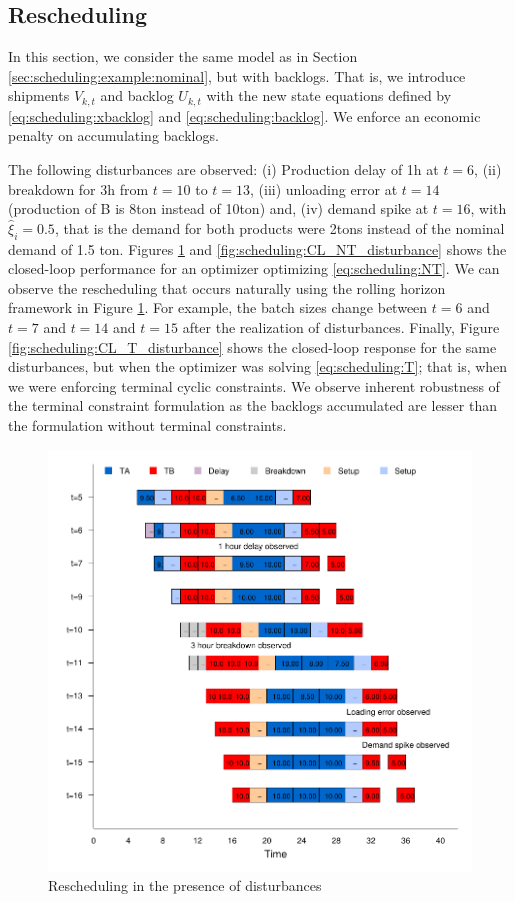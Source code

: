 \subsection{Rescheduling}
In this section, we consider the same model as in Section
\ref{sec:scheduling:example:nominal}, but with backlogs. That is, we
introduce shipments $V_{k,t}$ and backlog $U_{k,t}$ with the new state
equations defined by \eqref{eq:scheduling:xbacklog} and
\eqref{eq:scheduling:backlog}. We enforce an economic penalty on
accumulating backlogs. 

The following disturbances are observed: (i) Production delay of 1h
at $t=6$, (ii) breakdown for 3h  from $t=10$ to $t=13$, (iii)
unloading error at $t=14$ (production of  B is 8ton instead of 10ton)
and, (iv) demand spike at $t=16$, with $\hat{\xi}_i = 0.5$, that is
the demand for both products were 2tons instead of the nominal demand
of 1.5 ton. Figures \ref{fig:scheduling:gantt_NT_disturbance} and
\ref{fig:scheduling:CL_NT_disturbance} shows the closed-loop
performance for an optimizer optimizing \eqref{eq:scheduling:NT}. We
can observe the rescheduling that occurs naturally using the rolling
horizon framework in Figure
\ref{fig:scheduling:gantt_NT_disturbance}. For example, the batch
sizes change between $t=6$ and $t=7$ and $t=14$ and $t=15$ after the
realization of disturbances. Finally, Figure
\ref{fig:scheduling:CL_T_disturbance} shows the closed-loop response
for the same disturbances, but when the optimizer was solving
\eqref{eq:scheduling:T}; that is, when we were enforcing terminal
cyclic constraints. We observe  inherent robustness of the
terminal constraint formulation as the backlogs accumulated are
lesser than the formulation without terminal constraints. 
\begin{figure}
\begin{center}
\includegraphics{scheduling/gantt_NT_disturbance.pdf}
\caption{Rescheduling in the presence of disturbances}
\label{fig:scheduling:gantt_NT_disturbance}
\end{center}
\end{figure}

